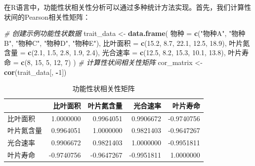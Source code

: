 \documentclass[
  twoside,12pt,fontset=none]{ctexbook}
\newenvironment{Shaded}{\begin{snugshade}}{\end{snugshade}}
\newcommand{\CommentTok}[1]{\textcolor[rgb]{0.56,0.35,0.01}{\textit{#1}}}
\newcommand{\DecValTok}[1]{\textcolor[rgb]{0.00,0.00,0.81}{#1}}
\newcommand{\FloatTok}[1]{\textcolor[rgb]{0.00,0.00,0.81}{#1}}
\newcommand{\FunctionTok}[1]{\textcolor[rgb]{0.13,0.29,0.53}{\textbf{#1}}}
\newcommand{\NormalTok}[1]{#1}
\newcommand{\OtherTok}[1]{\textcolor[rgb]{0.56,0.35,0.01}{#1}}
\newcommand{\SpecialCharTok}[1]{\textcolor[rgb]{0.81,0.36,0.00}{\textbf{#1}}}
\newcommand{\StringTok}[1]{\textcolor[rgb]{0.31,0.60,0.02}{#1}}
\begin{document}
在R语言中，功能性状相关性分析可以通过多种统计方法实现。首先，我们计算性状间的Pearson相关性矩阵：

\begin{Shaded}
\begin{Highlighting}[]
\CommentTok{\# 创建示例功能性状数据}
\NormalTok{trait\_data }\OtherTok{\textless{}{-}} \FunctionTok{data.frame}\NormalTok{(}
\NormalTok{  物种 }\OtherTok{=} \FunctionTok{c}\NormalTok{(}\StringTok{"物种A"}\NormalTok{, }\StringTok{"物种B"}\NormalTok{, }\StringTok{"物种C"}\NormalTok{, }\StringTok{"物种D"}\NormalTok{, }\StringTok{"物种E"}\NormalTok{),}
\NormalTok{  比叶面积 }\OtherTok{=} \FunctionTok{c}\NormalTok{(}\FloatTok{15.2}\NormalTok{, }\FloatTok{8.7}\NormalTok{, }\FloatTok{22.1}\NormalTok{, }\FloatTok{12.5}\NormalTok{, }\FloatTok{18.9}\NormalTok{),}
\NormalTok{  叶片氮含量 }\OtherTok{=} \FunctionTok{c}\NormalTok{(}\FloatTok{2.1}\NormalTok{, }\FloatTok{1.5}\NormalTok{, }\FloatTok{2.8}\NormalTok{, }\FloatTok{1.9}\NormalTok{, }\FloatTok{2.4}\NormalTok{),}
\NormalTok{  光合速率 }\OtherTok{=} \FunctionTok{c}\NormalTok{(}\FloatTok{12.5}\NormalTok{, }\FloatTok{8.2}\NormalTok{, }\FloatTok{15.3}\NormalTok{, }\FloatTok{10.1}\NormalTok{, }\FloatTok{13.8}\NormalTok{),}
\NormalTok{  叶片寿命 }\OtherTok{=} \FunctionTok{c}\NormalTok{(}\DecValTok{8}\NormalTok{, }\DecValTok{15}\NormalTok{, }\DecValTok{5}\NormalTok{, }\DecValTok{12}\NormalTok{, }\DecValTok{7}\NormalTok{)}
\NormalTok{)}
\CommentTok{\# 计算性状间相关性矩阵}
\NormalTok{cor\_matrix }\OtherTok{\textless{}{-}} \FunctionTok{cor}\NormalTok{(trait\_data[, }\SpecialCharTok{{-}}\DecValTok{1}\NormalTok{])}
\end{Highlighting}
\end{Shaded}

\begin{table}[!h]
\centering
\caption{\label{tab:trait-correlation-table}功能性状相关性矩阵}
\centering
\begin{tabular}[t]{lrrrr}
\toprule
  & 比叶面积 & 叶片氮含量 & 光合速率 & 叶片寿命\\
\midrule
比叶面积 & 1.0000000 & 0.9964051 & 0.9906672 & -0.9740756\\
叶片氮含量 & 0.9964051 & 1.0000000 & 0.9821403 & -0.9647267\\
光合速率 & 0.9906672 & 0.9821403 & 1.0000000 & -0.9951811\\
叶片寿命 & -0.9740756 & -0.9647267 & -0.9951811 & 1.0000000\\
\bottomrule
\end{tabular}
\end{table}
\end{document}
